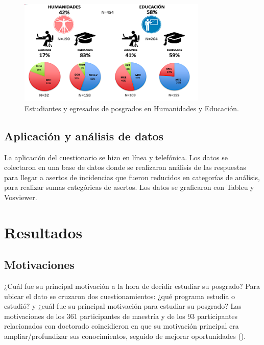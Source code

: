\documentclass{textolivre}
\begin{document}
\begin{figure}[htbp]
 \centering
 \includegraphics[width=0.8\textwidth]{Fig1.png}
 \caption{Estudiantes y egresados de posgrados en Humanidades y Educación.}
 \label{fig1}
\end{figure}

\subsection{Aplicación y análisis de datos}\label{sec-titulo}
La aplicación del cuestionario se hizo en línea y telefónica. Los datos se colectaron en una base de datos donde se realizaron análisis de las respuestas para llegar a asertos de incidencias \cite{stake_investigacion_2007} que fueron reducidos en categorías de análisis, para realizar sumas categóricas de asertos. Los datos se graficaron con Tableu y Vosviewer.

\section{Resultados}\label{sec-autores}

\subsection{Motivaciones}\label{sec-autores}
¿Cuál fue su principal motivación a la hora de decidir estudiar su posgrado?  Para ubicar el dato se cruzaron dos cuestionamientos: ¿qué programa estudia o estudió? y ¿cuál fue su principal motivación para estudiar su posgrado? Las motivaciones de los 361 participantes de maestría y de los 93 participantes relacionados con doctorado coincidieron en que su motivación principal era ampliar/profundizar sus conocimientos, seguido de mejorar oportunidades ().
 
\end{document}
